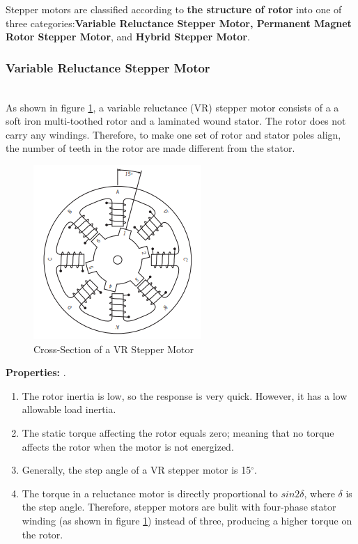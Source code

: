 \documentclass[journal]{IEEEtran}
\begin{document}
Stepper motors are classified according to \textbf{the structure of rotor} into one of three categories:\textbf{Variable Reluctance Stepper Motor, Permanent Magnet Rotor Stepper Motor}, and \textbf{Hybrid Stepper Motor}. \cite{rizzoni2007}\cite{stepperNotes} 

\subsubsection{Variable Reluctance Stepper Motor}\hfill\\
As shown in figure \ref{vrS}, a variable reluctance (VR) stepper motor consists of a a soft iron multi-toothed rotor and a laminated wound stator. The rotor does not carry any windings. Therefore, to make one set of rotor and stator poles align,  the number of teeth in the rotor are made different from the stator. \cite{guru2007} \cite{rizzoni2007} \\
\begin{figure}[h]
    \centering
    \includegraphics[scale=0.78]{Stepper/vrStep.png}
    \caption{Cross-Section of a VR Stepper Motor}
    \label{vrS}
\end{figure}

\textbf{Properties:}\cite{chapman2005} \cite{rizzoni2007}. \\
\begin{enumerate}
    \item The rotor inertia is low, so the response is very quick. However, it has a low allowable load inertia.
    \item The static torque affecting the rotor equals zero; meaning that no torque affects the rotor when the motor is not energized.
    \item Generally, the step angle of a VR stepper motor is 15$^{\circ}$.
    \item The torque in a reluctance motor is directly proportional to $sin 2{\delta}$, where ${\delta}$ is the step angle. Therefore, stepper motors are bulit with four-phase stator winding (as shown in figure \ref{vrS}) instead of three, producing a higher torque on the rotor.
\end{enumerate}
\end{document}
